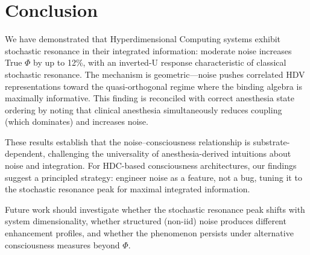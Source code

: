 \documentclass[12pt,a4paper]{article}
\begin{document}
\section{Conclusion}

We have demonstrated that Hyperdimensional Computing systems exhibit stochastic resonance in their integrated information: moderate noise increases True $\Phi$ by up to 12\%, with an inverted-U response characteristic of classical stochastic resonance. The mechanism is geometric---noise pushes correlated HDV representations toward the quasi-orthogonal regime where the binding algebra is maximally informative. This finding is reconciled with correct anesthesia state ordering by noting that clinical anesthesia simultaneously reduces coupling (which dominates) and increases noise.

These results establish that the noise--consciousness relationship is substrate-dependent, challenging the universality of anesthesia-derived intuitions about noise and integration. For HDC-based consciousness architectures, our findings suggest a principled strategy: engineer noise as a feature, not a bug, tuning it to the stochastic resonance peak for maximal integrated information.

Future work should investigate whether the stochastic resonance peak shifts with system dimensionality, whether structured (non-iid) noise produces different enhancement profiles, and whether the phenomenon persists under alternative consciousness measures beyond $\Phi$.
\end{document}
